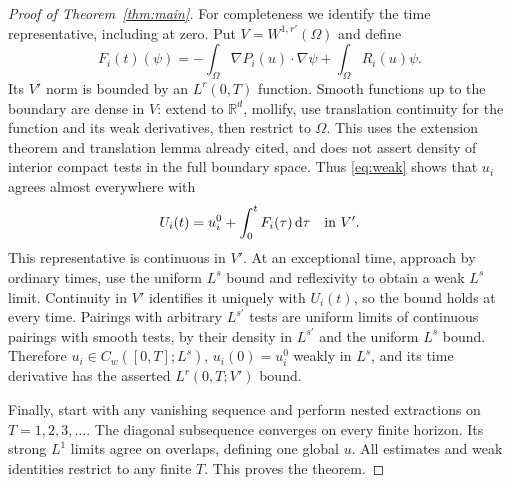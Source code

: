 \documentclass[11pt]{article}
\newcommand{\R}{\mathbb R}
\newcommand{\dd}{\,\mathrm d}
\newcommand{\Om}{\Omega}
\begin{document}
\begin{proof}[Proof of Theorem~\ref{thm:main}]
For completeness we identify the time representative, including at zero.
Put $V=W^{1,r'}(\Om)$ and define
\[
 F_i(t)(\psi)=-\int_\Om\nabla P_i(u)\cdot\nabla\psi
                         +\int_\Om R_i(u)\psi.
\]
Its $V'$ norm is bounded by an $L^r(0,T)$ function. Smooth functions up to
the boundary are dense in $V$: extend to $\R^d$, mollify, use translation
continuity for the function and its weak derivatives, then restrict to $\Om$.
This uses the extension theorem and translation lemma already cited, and
does not assert density of interior compact tests in the full boundary space.
Thus \eqref{eq:weak} shows that $u_i$ agrees almost everywhere with
\[
 U_i(t)=u_i^0+\int_0^tF_i(\tau)\dd\tau\quad\hbox{in }V'.
\]
This representative is continuous in $V'$. At an exceptional time,
approach by ordinary times, use the uniform $L^s$ bound and reflexivity to
obtain a weak $L^s$ limit. Continuity in $V'$ identifies it uniquely with
$U_i(t)$, so the bound holds at every time. Pairings with arbitrary
$L^{s'}$ tests are uniform limits of continuous pairings with smooth tests,
by their density in $L^{s'}$ and the uniform $L^s$ bound.
Therefore $u_i\in C_w([0,T];L^s)$, $u_i(0)=u_i^0$ weakly in $L^s$,
and its time derivative has the asserted $L^r(0,T;V')$ bound.

Finally, start with any vanishing sequence and perform nested extractions
on $T=1,2,3,\ldots$. The diagonal subsequence converges on every finite
horizon. Its strong $L^1$ limits agree on overlaps, defining one global
$u$. All estimates and weak identities restrict to any finite $T$.
This proves the theorem.
\end{proof}
\end{document}
